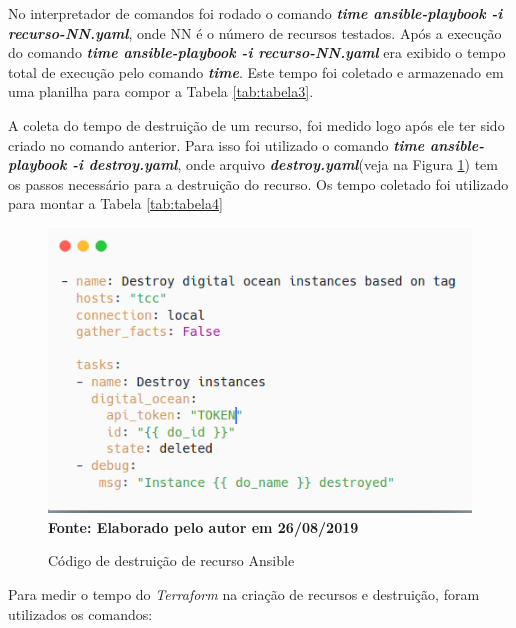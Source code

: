 \hfill


No interpretador de comandos foi rodado o comando \textbf{\textit{time ansible-playbook -i recurso-NN.yaml}}, onde NN é o número de recursos testados. Após a execução do comando \textbf{\textit{time ansible-playbook -i recurso-NN.yaml}} era exibido o tempo total de execução pelo comando \textbf{\textit{time}}. Este tempo foi coletado e armazenado em uma planilha para compor a Tabela \ref{tab:tabela3}.

A coleta do tempo de destruição de um recurso, foi medido logo após ele ter sido criado no comando anterior. Para isso foi utilizado o comando \textbf{\textit{time ansible-playbook -i destroy.yaml}}, onde arquivo \textbf{\textit{destroy.yaml}}(veja na Figura \ref{fig:figura2}) tem os passos necessário para a destruição do recurso. Os tempo coletado foi utilizado para montar a Tabela \ref{tab:tabela4}   

\begin{figure}[H]
	\centering	
	\caption[\hspace{0.1cm} Código de destruição de recurso Ansible]{Código de destruição de recurso Ansible}
	\vspace{-0.4cm}
	\includegraphics[width=1.0\textwidth]{artigo/figuras/destroy_codigo_ansible.png}
	 \vspace{-0.2cm}
	\\\textbf{\footnotesize Fonte: Elaborado pelo autor em 26/08/2019}
	\label{fig:figura2}
\end{figure}
\vspace{-0.5cm}

Para medir o tempo do \textit{Terraform} na criação de recursos e destruição, foram utilizados os comandos:

